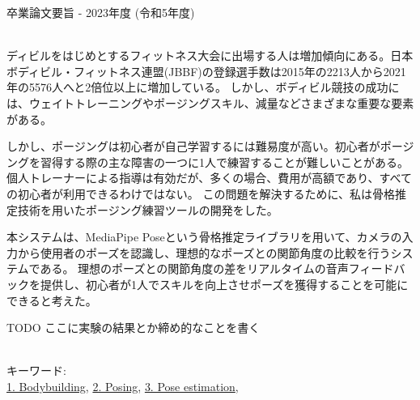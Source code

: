 卒業論文要旨 - 2023年度 (令和5年度)
\begin{center}
\begin{large}
\end{large}
\end{center}

~ \\
  ディビルをはじめとするフィットネス大会に出場する人は増加傾向にある。日本ボディビル・フィットネス連盟(JBBF)の登録選手数は2015年の2213人から2021年の5576人へと2倍位以上に増加している\cite{jbbf}。
  しかし、ボディビル競技の成功には、ウェイトトレーニングやポージングスキル、減量などさまざまな重要な要素がある。

  しかし、ポージングは初心者が自己学習するには難易度が高い。初心者がポージングを習得する際の主な障害の一つに1人で練習することが難しいことがある。
  個人トレーナーによる指導は有効だが、多くの場合、費用が高額であり、すべての初心者が利用できるわけではない。
  この問題を解決するために、私は骨格推定技術を用いたポージング練習ツールの開発をした。

  本システムは、MediaPipe Poseという骨格推定ライブラリを用いて、カメラの入力から使用者のポーズを認識し、理想的なポーズとの関節角度の比較を行うシステムである。
  理想のポーズとの関節角度の差をリアルタイムの音声フィードバックを提供し、初心者が1人でスキルを向上させポーズを獲得することを可能にできると考えた。

  TODO ここに実験の結果とか締め的なことを書く

~ \\
キーワード:\\
\underline{1. Bodybuilding},
\underline{2. Posing},
\underline{3. Pose estimation},
\begin{flushright}
\dept \\
\author
\end{flushright}

